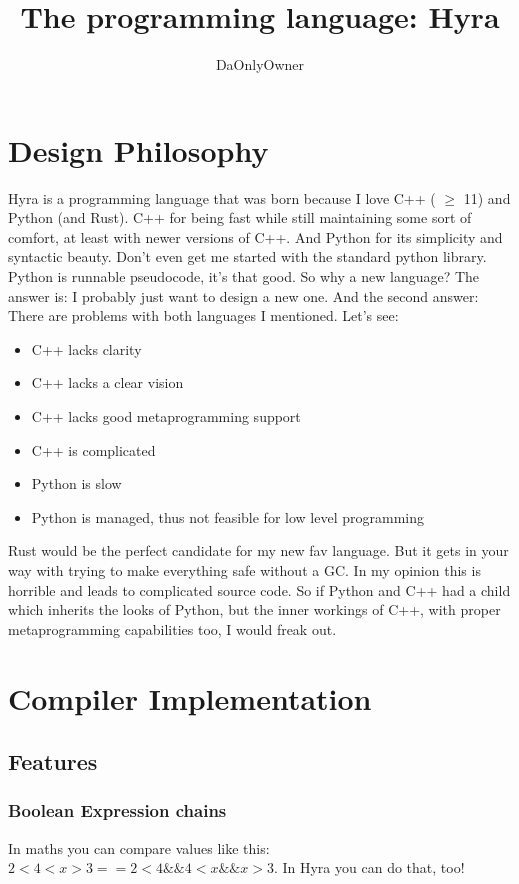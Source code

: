 \documentclass[]{article}
\title{The programming language: Hyra}
\author{DaOnlyOwner}
\begin{document}
\maketitle

\section{Design Philosophy}
Hyra is a programming language that was born because I love C++ ( $\geq$ 11) and Python (and Rust). C++ for being fast while still maintaining some sort of comfort, at least with newer versions of C++. And Python for its simplicity and syntactic beauty. Don't even get me started with the standard python library. Python is runnable pseudocode, it's that good. So why a new language? The answer is: I probably just want to design a new one. And the second answer: There are problems with both languages I mentioned. Let's see: 
\begin{itemize}
	\item C++ lacks clarity
	\item C++ lacks a clear vision
	\item C++ lacks good metaprogramming support
	\item C++ is complicated
	\item Python is slow
	\item Python is managed, thus not feasible for low level programming
\end{itemize}
Rust would be the perfect candidate for my new fav language. But it gets in your way with trying to make everything safe without a GC. In my opinion this is horrible and leads to complicated source code. 
So if Python and C++ had a child which inherits the looks of Python, but the inner workings of C++, with proper metaprogramming capabilities too, I would freak out.

\section{Compiler Implementation}
\subsection{Features}
\subsubsection{Boolean Expression chains}
In maths you can compare values like this: $ 2<4<x>3 == 2<4  \&\& 4<x \&\& x>3 $.
In Hyra you can do that, too!
\end{document}
